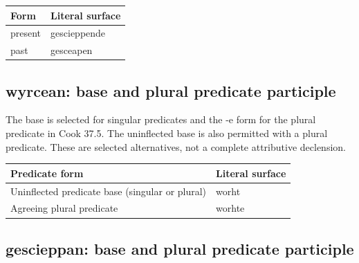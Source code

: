 \par\begingroup
\fontsize{10.5}{13.2}\selectfont
\setlength{\LTleft}{0pt}\setlength{\LTright}{\fill}
\noindent
\begin{tabular}{@{}>{\raggedright\arraybackslash}p{51.9mm}>{\raggedright\arraybackslash}p{69.29mm}@{}}
\toprule
\textbf{Form} & \textbf{Literal surface} \\
\midrule
present & gescieppende \\
past & gesceapen \\
\bottomrule
\end{tabular}
\par\endgroup

\subsection*{wyrcean: base and plural predicate participle}

The base is selected for singular predicates and the -e form for the plural predicate in Cook 37.5. The uninflected base is also permitted with a plural predicate. These are selected alternatives, not a complete attributive declension.

\par\begingroup
\fontsize{10.5}{13.2}\selectfont
\setlength{\LTleft}{0pt}\setlength{\LTright}{\fill}
\noindent
\begin{tabular}{@{}>{\raggedright\arraybackslash}p{87.2mm}>{\raggedright\arraybackslash}p{33.98mm}@{}}
\toprule
\textbf{Predicate form} & \textbf{Literal surface} \\
\midrule
Uninflected predicate base (singular or plural) & worht \\
Agreeing plural predicate & worhte \\
\bottomrule
\end{tabular}
\par\endgroup

\subsection*{gescieppan: base and plural predicate participle}

